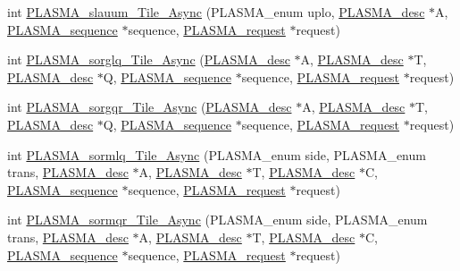 \begin{DoxyCompactItemize}
\item 
int \hyperlink{group__float__Tile__Async_gaaa01b3ab2e7be4bec4e0c61aabb4b708_gaaa01b3ab2e7be4bec4e0c61aabb4b708}{P\+L\+A\+S\+M\+A\+\_\+slauum\+\_\+\+Tile\+\_\+\+Async} (P\+L\+A\+S\+M\+A\+\_\+enum uplo, \hyperlink{structplasma__desc__t}{P\+L\+A\+S\+M\+A\+\_\+desc} $\ast$A, \hyperlink{structplasma__sequence__t}{P\+L\+A\+S\+M\+A\+\_\+sequence} $\ast$sequence, \hyperlink{structplasma__request__t}{P\+L\+A\+S\+M\+A\+\_\+request} $\ast$request)
\item 
int \hyperlink{group__float__Tile__Async_ga7fb841270fbdaadef4cdc38d7a879145_ga7fb841270fbdaadef4cdc38d7a879145}{P\+L\+A\+S\+M\+A\+\_\+sorglq\+\_\+\+Tile\+\_\+\+Async} (\hyperlink{structplasma__desc__t}{P\+L\+A\+S\+M\+A\+\_\+desc} $\ast$A, \hyperlink{structplasma__desc__t}{P\+L\+A\+S\+M\+A\+\_\+desc} $\ast$T, \hyperlink{structplasma__desc__t}{P\+L\+A\+S\+M\+A\+\_\+desc} $\ast$Q, \hyperlink{structplasma__sequence__t}{P\+L\+A\+S\+M\+A\+\_\+sequence} $\ast$sequence, \hyperlink{structplasma__request__t}{P\+L\+A\+S\+M\+A\+\_\+request} $\ast$request)
\item 
int \hyperlink{group__float__Tile__Async_gaf15801641689a99513f4493164c19e0f_gaf15801641689a99513f4493164c19e0f}{P\+L\+A\+S\+M\+A\+\_\+sorgqr\+\_\+\+Tile\+\_\+\+Async} (\hyperlink{structplasma__desc__t}{P\+L\+A\+S\+M\+A\+\_\+desc} $\ast$A, \hyperlink{structplasma__desc__t}{P\+L\+A\+S\+M\+A\+\_\+desc} $\ast$T, \hyperlink{structplasma__desc__t}{P\+L\+A\+S\+M\+A\+\_\+desc} $\ast$Q, \hyperlink{structplasma__sequence__t}{P\+L\+A\+S\+M\+A\+\_\+sequence} $\ast$sequence, \hyperlink{structplasma__request__t}{P\+L\+A\+S\+M\+A\+\_\+request} $\ast$request)
\item 
int \hyperlink{group__float__Tile__Async_ga4fb93ad68adf32cbd022eeaa0b55ba7b_ga4fb93ad68adf32cbd022eeaa0b55ba7b}{P\+L\+A\+S\+M\+A\+\_\+sormlq\+\_\+\+Tile\+\_\+\+Async} (P\+L\+A\+S\+M\+A\+\_\+enum side, P\+L\+A\+S\+M\+A\+\_\+enum trans, \hyperlink{structplasma__desc__t}{P\+L\+A\+S\+M\+A\+\_\+desc} $\ast$A, \hyperlink{structplasma__desc__t}{P\+L\+A\+S\+M\+A\+\_\+desc} $\ast$T, \hyperlink{structplasma__desc__t}{P\+L\+A\+S\+M\+A\+\_\+desc} $\ast$C, \hyperlink{structplasma__sequence__t}{P\+L\+A\+S\+M\+A\+\_\+sequence} $\ast$sequence, \hyperlink{structplasma__request__t}{P\+L\+A\+S\+M\+A\+\_\+request} $\ast$request)
\item 
int \hyperlink{group__float__Tile__Async_ga0d590a7126c4bdd845552f0515b9cd9d_ga0d590a7126c4bdd845552f0515b9cd9d}{P\+L\+A\+S\+M\+A\+\_\+sormqr\+\_\+\+Tile\+\_\+\+Async} (P\+L\+A\+S\+M\+A\+\_\+enum side, P\+L\+A\+S\+M\+A\+\_\+enum trans, \hyperlink{structplasma__desc__t}{P\+L\+A\+S\+M\+A\+\_\+desc} $\ast$A, \hyperlink{structplasma__desc__t}{P\+L\+A\+S\+M\+A\+\_\+desc} $\ast$T, \hyperlink{structplasma__desc__t}{P\+L\+A\+S\+M\+A\+\_\+desc} $\ast$C, \hyperlink{structplasma__sequence__t}{P\+L\+A\+S\+M\+A\+\_\+sequence} $\ast$sequence, \hyperlink{structplasma__request__t}{P\+L\+A\+S\+M\+A\+\_\+request} $\ast$request)

\end{DoxyCompactItemize}
